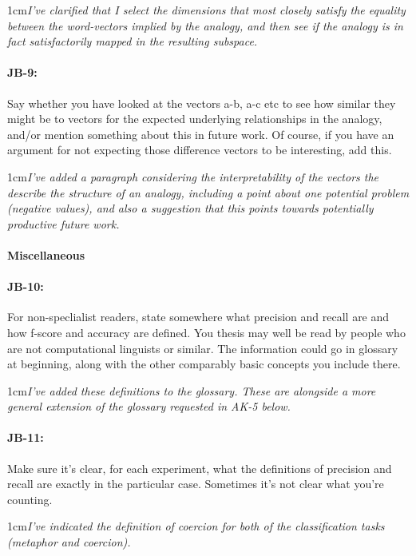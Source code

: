 \documentclass[11pt,a4paper]{article}
\newcommand{\res}[1]{\vspace{0.25cm} \begin{adjustwidth}{1cm}{}\emph{#1}\end{adjustwidth}}
\begin{document}
\res{I've clarified that I select the dimensions that most closely satisfy the equality between the word-vectors implied by the analogy, and then see if the analogy is in fact satisfactorily mapped in the resulting subspace.}

\paragraph{JB-9:} Say whether you have looked at the vectors a-b, a-c etc to see how similar they might be to vectors for the expected underlying relationships in the analogy, and/or mention something about this in future work. Of course, if you have an argument for not expecting those difference vectors to be interesting, add this.

\res{I've added a paragraph considering the interpretability of the vectors the describe the structure of an analogy, including a point about one potential problem (negative values), and also a suggestion that this points towards potentially productive future work.}


\paragraph{Miscellaneous}

\paragraph{JB-10:} For non-speclialist readers, state somewhere what precision and recall are and how f-score and accuracy are defined. You thesis may well be read by people who are not computational linguists or similar. The information could go in glossary at beginning, along with the other comparably basic concepts you include there.

\res{I've added these definitions to the glossary.  These are alongside a more general extension of the glossary requested in AK-5 below.}

\paragraph{JB-11:} Make sure it's clear, for each experiment, what the definitions of precision and recall are exactly in the particular case. Sometimes it's not clear what you're counting.

\res{I've indicated the definition of coercion for both of the classification tasks (metaphor and coercion).}
\end{document}
